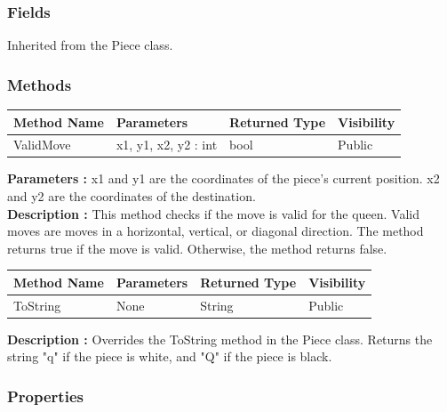 \documentclass[12pt]{article}
\begin{document}
\subsubsection{Fields}

    Inherited from the Piece class.

\subsubsection{Methods}

\begin{table}[H]
    \begin{tabular}{|l|l|l|l|}
    \hline
    \rowcolor[HTML]{EFEFEF} 
    \cellcolor[HTML]{EFEFEF}\textbf{Method Name} & \textbf{Parameters}  & \textbf{Returned Type} & \textbf{Visibility} \\ \hline
    ValidMove                          & x1, y1, x2, y2 : int & bool                   & Public              \\ \hline
    \end{tabular}
\end{table}

    \textbf{Parameters :} x1 and y1 are the coordinates of the piece's current position.
    x2 and y2 are the coordinates of the destination.  
\\
    \textbf{Description :} This method checks if the move is valid for the queen. 
    Valid moves are moves in a horizontal, vertical, or diagonal direction.
    The method returns true if the move is valid.
    Otherwise, the method returns false.

\begin{table}[H]
    \begin{tabular}{|l|l|l|l|}
    \hline
    \rowcolor[HTML]{EFEFEF} 
    \cellcolor[HTML]{EFEFEF}\textbf{Method Name} & \textbf{Parameters}  & \textbf{Returned Type} & \textbf{Visibility} \\ \hline
    ToString                                   & None                 & String                   & Public              \\ \hline
    \end{tabular}
\end{table}

    \textbf{Description :} Overrides the ToString method in the Piece class.
    Returns the string "q" if the piece is white, and "Q" if the piece is black. 

\subsubsection{Properties}
\end{document}
